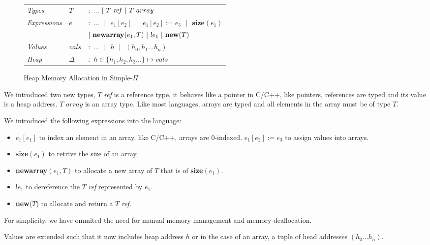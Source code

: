 \documentclass[a4paper,12pt]{report}
\begin{document}
\begin{figure}[H]
  \begin{center}
    \begin{tabular} {l l l}
      \textit{Types} & $T$& $:$ $...\text{ }|\text{ }T\text{ \textit{ref }}|\text{ } T \text{ }array$ \\
      \textit{Expressions} & $e$& $:$ $...\text{ }|\text{ }e_1[e_2]\text{ }
        |\text{ }e_1[e_2] := e_3\text{ }|\text{ }\textbf{size}(e_1)$ \\
        & & \; $|\text{ }\textbf{newarray}(e_1, T)\text{ }|\text{ }!e_1\text{ }|\text{ \textbf{new}}(T)$ \\
     \textit{Values} & $vals$& $:$ $...\text{ }|\text{ }h\text{ }|\text{ }(h_0,h_1...h_n)$ \\
     \textit{Heap} & $\Delta$& $:$ $h \in \{h_1,h_2, h_3...\} \mapsto vals$\\
    \end{tabular}
  \end{center}
  \caption{Heap Memory Allocation in Simple-$\Pi$}
\end{figure}


\par
We introduced two new types, $T$ \textit{ref} is a reference type, it behaves 
like a pointer in C/C++, like pointers, references are typed and its value is a heap address. 
$T$ $array$ is an array type. Like most languages, arrays are typed 
and all elements in the array must be of type $T$.

\par
We introduced the following expressions into the language:
\begin{itemize}
  \item $e_1[e_1]$ to index an element in an array, like C/C++, arrays are 
  0-indexed. $e_1[e_2] := e_3$ to assign values into arrays.
  \item \textbf{size}$(e_1)$ to retrive the size of an array.
  \item \textbf{newarray}$(e_1, T)$ to allocate a new array of $T$ that is of 
  \textbf{size}$(e_1)$.
  \item $!e_1$ to dereference the $T$ \textit{ref} represented by $e_1$.
  \item \textbf{new}($T$) to allocate and return a $T$ \textit{ref}.
\end{itemize}
\par
For simplicity, we have ommited the need for manual memory management and memory 
deallocation.

\par
Values are extended such that it now includes heap address $h$ or in the case of 
an array, a tuple of head addresses $(h_0...h_n)$. 
\end{document}
